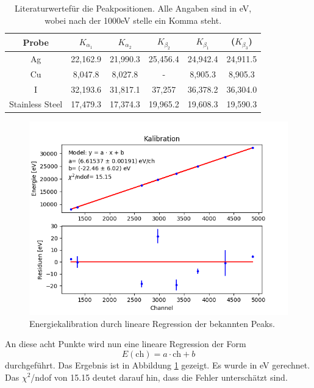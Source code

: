 \documentclass[12pt,a4paper]{article}
\begin{document}
\begin{table}
\centering
\begin{tabular}{|c|c|c|c|c|c|}
\hline 
Probe & $K_{\alpha_1}$ & $K_{\alpha_2}$ & $K_{\beta_2}$ & $K_{\beta_{1}}$ & ($K_{\beta_{3}}$) \\ 
\hline 
Ag & 22,162.9 & 21,990.3 & 25,456.4 & 24,942.4 & 24,911.5\\ 
\hline 
Cu & 8,047.8 & 8,027.8 & - & 8,905.3 & 8,905.3\\ 
\hline
I & 32,193.6 & 31,817.1 & 37,257 & 36,378.2 & 36,304.0\\ 
\hline 
Stainless Steel & 17,479.3 & 17,374.3 & 19,965.2 & 19,608.3 & 19,590.3\\ 
\hline 
\end{tabular} 
\caption[test]{Literaturwerte\footnotemark für die Peakpositionen. Alle Angaben sind in eV, wobei nach der 1000eV stelle ein Komma steht.}
\label{tab:röntgen_lit}
\end{table}

\begin{figure}
\centering
\includegraphics[scale=0.8]{Bilder/roentgen/Kalibration/linReg.png}
\caption{Energiekalibration durch lineare Regression der bekannten Peaks.}
\label{fig:röntgen_linReg}
\end{figure}

An diese acht Punkte wird nun eine lineare Regression der Form
\begin{equation*}
E (\textrm{ch}) = a \cdot \textrm{ch} + b
\end{equation*}
durchgeführt. Das Ergebnis ist in Abbildung \ref{fig:röntgen_linReg} gezeigt. Es wurde in eV gerechnet. Das $\chi ^2$/ndof von 15.15 deutet darauf hin, dass die Fehler unterschätzt sind.
\end{document}
